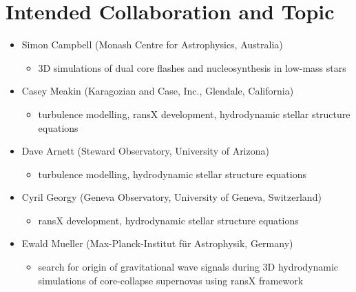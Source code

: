 \documentclass[11pt,paper=a4]{article}
\begin{document}
\section{Intended Collaboration and Topic}

\begin{itemize}
\item Simon Campbell (Monash Centre for Astrophysics, Australia)
\begin{itemize}
\item 3D simulations of dual core flashes and nucleosynthesis in low-mass stars    
\end{itemize}  
\item Casey Meakin (Karagozian and Case, Inc., Glendale, California)
\begin{itemize}
\item turbulence modelling, ransX development, hydrodynamic stellar structure equations
\end{itemize}  
\item Dave Arnett (Steward Observatory, University of Arizona)
\begin{itemize}
\item turbulence modelling, hydrodynamic stellar structure equations
\end{itemize}   
\item Cyril Georgy (Geneva Observatory, University of Geneva, Switzerland)
\begin{itemize}
\item ransX development, hydrodynamic stellar structure equations
\end{itemize}    
\item Ewald Mueller (Max-Planck-Institut f\"ur Astrophysik, Germany)
\begin{itemize}
\item search for origin of gravitational wave signals during 3D hydrodynamic simulations of core-collapse supernovas using ransX framework 
\end{itemize} 
\end{itemize}
  
\end{document}
